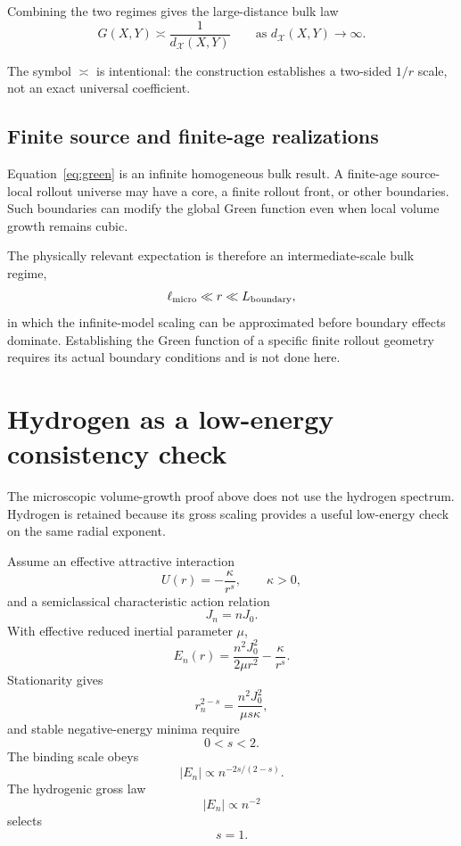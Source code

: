 \documentclass[11pt]{article}
\newcommand{\cX}{\mathcal{X}}
\begin{document}
Combining the two regimes gives the large-distance bulk law
\begin{equation}
\boxed{
G(X,Y)
\asymp
\frac{1}{d_{\cX}(X,Y)}
\qquad
\text{as }d_{\cX}(X,Y)\rightarrow\infty.
}
\label{eq:green}
\end{equation}

The symbol \(\asymp\) is intentional: the construction establishes a two-sided \(1/r\) scale, not an exact universal coefficient.

\subsection{Finite source and finite-age realizations}

Equation~\eqref{eq:green} is an infinite homogeneous bulk result. A finite-age source-local rollout universe may have a core, a finite rollout front, or other boundaries. Such boundaries can modify the global Green function even when local volume growth remains cubic.

The physically relevant expectation is therefore an intermediate-scale bulk regime,
\begin{equation}
\ell_{\rm micro}
\ll
r
\ll
L_{\rm boundary},
\end{equation}
in which the infinite-model scaling can be approximated before boundary effects dominate. Establishing the Green function of a specific finite rollout geometry requires its actual boundary conditions and is not done here.

\section{Hydrogen as a low-energy consistency check}

The microscopic volume-growth proof above does not use the hydrogen spectrum. Hydrogen is retained because its gross scaling provides a useful low-energy check on the same radial exponent.

Assume an effective attractive interaction
\begin{equation}
U(r)=-\frac{\kappa}{r^s},
\qquad \kappa>0,
\end{equation}
and a semiclassical characteristic action relation
\begin{equation}
J_n=nJ_0.
\end{equation}
With effective reduced inertial parameter \(\mu\),
\begin{equation}
E_n(r)
=
\frac{n^2J_0^2}{2\mu r^2}
-\frac{\kappa}{r^s}.
\end{equation}
Stationarity gives
\begin{equation}
r_n^{2-s}
=
\frac{n^2J_0^2}{\mu s\kappa},
\end{equation}
and stable negative-energy minima require
\[
0<s<2.
\]
The binding scale obeys
\begin{equation}
|E_n|
\propto
n^{-2s/(2-s)}.
\end{equation}
The hydrogenic gross law
\[
|E_n|\propto n^{-2}
\]
selects
\[
s=1.
\]
\end{document}
